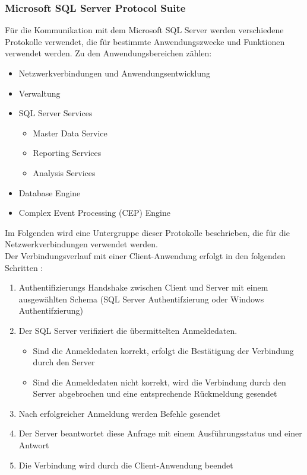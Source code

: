 \subsubsection{Microsoft SQL Server Protocol Suite}
Für die Kommunikation mit dem Microsoft SQL Server werden verschiedene Protokolle verwendet, die für bestimmte Anwendungszwecke und Funktionen verwendet werden. Zu den Anwendungsbereichen zählen:
\begin{itemize}
\item Netzwerkverbindungen und Anwendungsentwicklung
\item Verwaltung
\item SQL Server Services
\begin{itemize}
\item Master Data Service
\item Reporting Services
\item Analysis Services
\end{itemize}
\item Database Engine
\item Complex Event Processing (CEP) Engine
\end{itemize}
\citep{SQLProt1}
Im Folgenden wird eine Untergruppe dieser Protokolle beschrieben, die für die Netzwerkverbindungen verwendet werden. \\

Der Verbindungsverlauf mit einer Client-Anwendung erfolgt in den folgenden Schritten \citep{SQLProt1}:
\begin{enumerate}
\item Authentifizierungs Handshake zwischen Client und Server mit einem ausgewählten Schema (SQL Server Authentifzierung oder Windows Authentifzierung)
\item Der SQL Server verifiziert die übermittelten Anmeldedaten. 
\begin{itemize}
\item Sind die Anmeldedaten korrekt, erfolgt die Bestätigung der Verbindung durch den Server
\item Sind die Anmeldedaten nicht korrekt, wird die Verbindung durch den Server abgebrochen und eine entsprechende Rückmeldung gesendet
\end{itemize}
\item Nach erfolgreicher Anmeldung werden Befehle gesendet
\item Der Server beantwortet diese Anfrage mit einem Ausführungsstatus und einer Antwort
\item Die Verbindung wird durch die Client-Anwendung beendet
\end{enumerate}


